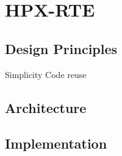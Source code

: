 \chapter{HPX-RTE}
\label{sec:HPX-RTE}

\section{Design Principles}
\label{sec:design}
Simplicity
Code reuse

\section{Architecture}
\label{sec:architecture}

\section{Implementation}
\label{sec:implementation}

